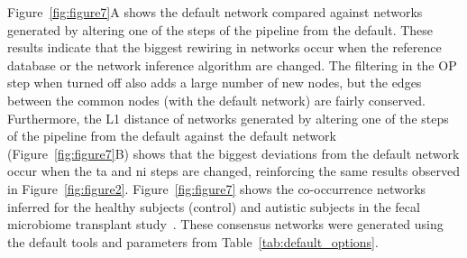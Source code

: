   Figure~\ref{fig:figure7}A shows the default network compared against networks generated by altering one of the steps of the pipeline from the default.
  These results indicate that the biggest rewiring in networks occur when the reference database or the network inference algorithm are changed.
  The filtering in the \ac{OP} step when turned off also adds a large number of new nodes, but the edges between the common nodes (with the default network) are fairly conserved.
  Furthermore, the L1 distance of networks generated by altering one of the steps of the pipeline from the default against the default network (Figure~\ref{fig:figure7}B) shows that the biggest deviations from the default network occur when the \ac{ta} and \ac{ni} steps are changed, reinforcing the same results observed in Figure~\ref{fig:figure2}.
  Figure~\ref{fig:figure7} shows the co-occurrence networks inferred for the healthy subjects (control) and autistic subjects in the fecal microbiome transplant study~\cite{Kang2017}.
  These consensus networks were generated using the default tools and parameters from Table~\ref{tab:default_options}.

